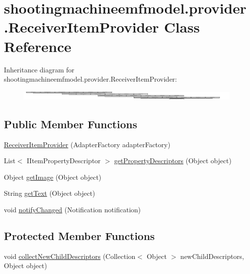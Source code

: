 \hypertarget{classshootingmachineemfmodel_1_1provider_1_1_receiver_item_provider}{\section{shootingmachineemfmodel.\-provider.\-Receiver\-Item\-Provider Class Reference}
\label{classshootingmachineemfmodel_1_1provider_1_1_receiver_item_provider}
}
Inheritance diagram for shootingmachineemfmodel.\-provider.\-Receiver\-Item\-Provider\-:\begin{figure}[H]
\begin{center}
\leavevmode
\includegraphics[height=0.534759cm]{classshootingmachineemfmodel_1_1provider_1_1_receiver_item_provider}
\end{center}
\end{figure}
\subsection*{Public Member Functions}
\begin{DoxyCompactItemize}
\item 
\hyperlink{classshootingmachineemfmodel_1_1provider_1_1_receiver_item_provider_a27c2804219522c0387979b8af37e53a5}{Receiver\-Item\-Provider} (Adapter\-Factory adapter\-Factory)
\item 
List$<$ I\-Item\-Property\-Descriptor $>$ \hyperlink{classshootingmachineemfmodel_1_1provider_1_1_receiver_item_provider_a421c988e48f20be9389821969fe7b9c2}{get\-Property\-Descriptors} (Object object)
\item 
Object \hyperlink{classshootingmachineemfmodel_1_1provider_1_1_receiver_item_provider_aca40ec242bf377eaac93810909587e51}{get\-Image} (Object object)
\item 
String \hyperlink{classshootingmachineemfmodel_1_1provider_1_1_receiver_item_provider_a19a5a055740422005f5e3b5c1ce910db}{get\-Text} (Object object)
\item 
void \hyperlink{classshootingmachineemfmodel_1_1provider_1_1_receiver_item_provider_afd2dc4f23c5bdb842b5c26899f77773d}{notify\-Changed} (Notification notification)
\end{DoxyCompactItemize}
\subsection*{Protected Member Functions}
\begin{DoxyCompactItemize}
\item 
void \hyperlink{classshootingmachineemfmodel_1_1provider_1_1_receiver_item_provider_afdea49a4a56ffc8985b709b62c01301b}{collect\-New\-Child\-Descriptors} (Collection$<$ Object $>$ new\-Child\-Descriptors, Object object)
\end{DoxyCompactItemize}


